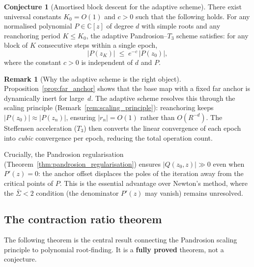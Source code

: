 \documentclass[11pt,a4paper]{article}
\theoremstyle{definition}
\newtheorem{conjecture}{Conjecture}[section]
\newtheorem{remark}{Remark}[section]
\newcommand{\CC}{\mathbb{C}}
\begin{document}
\begin{conjecture}[Amortised block descent for the adaptive scheme]
\label{conj:block_descent}
There exist universal constants $K_0 = O(1)$ and $c > 0$ such that the following holds.  For any normalised polynomial $P \in \CC[z]$ of degree $d$ with simple roots and any reanchoring period $K \leq K_0$, the adaptive Pandrosion--$T_3$ scheme satisfies: for any block of $K$ consecutive steps within a single epoch,
\begin{equation}
  \label{eq:block_descent}
  |P(z_{K})| \;\leq\; e^{-c}\, |P(z_0)|,
\end{equation}
where the constant $c > 0$ is independent of $d$ and $P$.
\end{conjecture}

\begin{remark}[Why the adaptive scheme is the right object]
\label{rem:why_adaptive}
Proposition~\ref{prop:far_anchor} shows that the base map with a fixed far anchor is dynamically inert for large~$d$.  The adaptive scheme resolves this through the scaling principle (Remark~\ref{rem:scaling_principle}): reanchoring keeps $|P(z_0)| \approx |P(z_n)|$, ensuring $|r_n| = O(1)$ rather than $O(R^{-d})$.  The Steffensen acceleration ($T_3$) then converts the linear convergence of each epoch into \emph{cubic} convergence per epoch, reducing the total operation count.

Crucially, the Pandrosion regularisation (Theorem~\ref{thm:pandrosion_regularisation}) ensures $|Q(z_0,z)| \gg 0$ even when $P'(z) = 0$: the anchor offset displaces the poles of the iteration away from the critical points of $P$.  This is the essential advantage over Newton's method, where the $\bar{\Sigma} < 2$ condition (the denominator $P'(z)$ may vanish) remains unresolved.
\end{remark}

\subsection{The contraction ratio theorem}
\label{sec:contraction_ratio}

The following theorem is the central result connecting the Pandrosion scaling principle to polynomial root-finding.  It is a \textbf{fully proved} theorem, not a conjecture.
\end{document}
